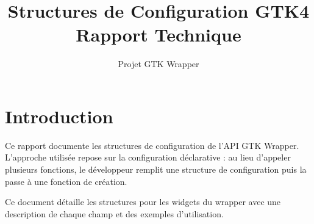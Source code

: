 \documentclass[12pt,a4paper]{article}
\title{Structures de Configuration GTK4 \\ Rapport Technique}
\author{Projet GTK Wrapper}
\begin{document}
\maketitle

\tableofcontents

\newpage

\section{Introduction}
Ce rapport documente les structures de configuration de l'API GTK Wrapper. L'approche utilisée repose sur la configuration déclarative : au lieu d'appeler plusieurs fonctions, le développeur remplit une structure de configuration puis la passe à une fonction de création.

Ce document détaille les structures pour les widgets du wrapper avec une description de chaque champ et des exemples d'utilisation.

\newpage












\end{document}
